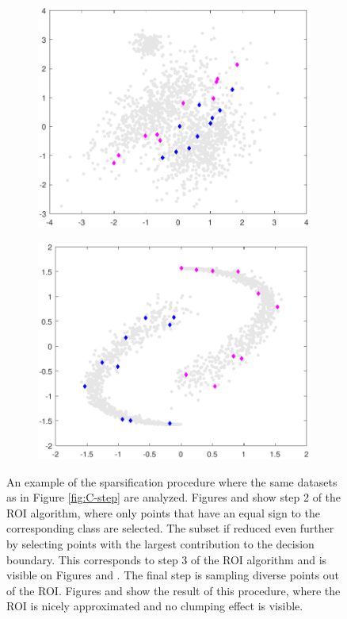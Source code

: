 \documentclass[preprint,12pt]{elsarticle}
\begin{document}
\begin{figure}[!htb]
	\begin{subfigure}[b]{0.40\linewidth}
		\centering\includegraphics[width=1\linewidth]{figures/normdatamodel_landm3.pdf}
		\caption{\label{fig:DPP1}}
	\end{subfigure}
	\begin{subfigure}[b]{0.40\linewidth}
		\centering\includegraphics[width=1\linewidth]{figures/yydatamodel_landm3.pdf}
		\caption{\label{fig:DPP2}}
	\end{subfigure}
	\caption{An example of the sparsification procedure where the same datasets as in Figure \ref{fig:C-step} are analyzed. Figures  and  show step 2 of the ROI algorithm, where only points that have an equal sign to the corresponding class are selected. The subset if reduced even further by selecting points with the largest contribution to the decision boundary. This corresponds to step 3 of the ROI algorithm and is visible on Figures  and . The final step is sampling diverse points out of the ROI. Figures  and  show the result of this procedure, where the ROI is nicely approximated and no clumping effect is visible.}
	\label{fig:sparsensses}
	\end{figure}
\end{document}
